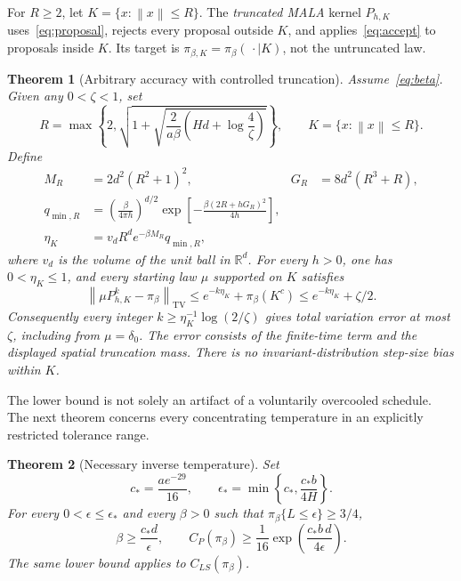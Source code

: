 \documentclass[11pt,letterpaper]{article}
\numberwithin{equation}{section}
\newtheorem{theorem}{Theorem}[section]
\theoremstyle{remark}
\newcommand{\R}{\mathbb R}
\newcommand{\TV}{\mathrm{TV}}
\newcommand{\1}{\mathbf 1}
\newcommand{\norm}[1]{\left\lVert#1\right\rVert}
\begin{document}
For $R\ge2$, let $K=\{x:\norm x\le R\}$. The \emph{truncated MALA} kernel $P_{h,K}$ uses~\eqref{eq:proposal}, rejects every proposal outside $K$, and applies~\eqref{eq:accept} to proposals inside $K$. Its target is $\pi_{\beta,K}=\pi_\beta(\,\cdot\mid K)$, not the untruncated law.

\begin{theorem}[Arbitrary accuracy with controlled truncation]\label{thm:upper}
Assume~\eqref{eq:beta}. Given any $0<\zeta<1$, set
\begin{equation}\label{eq:R}
 R=\max\left\{2,\sqrt{1+\sqrt{\frac2{a\beta}
                   \left(Hd+\log\frac4\zeta\right)}}\right\},
 \qquad K=\{x:\norm x\le R\}.
\end{equation}
Define
\begin{align}
 M_R&=2d^2(R^2+1)^2,& G_R&=8d^2(R^3+R),\label{eq:MG}\\
 q_{\min,R}&=\left(\frac\beta{4\pi h}\right)^{d/2}
 \exp\!\left[-\frac{\beta(2R+hG_R)^2}{4h}\right],\label{eq:qmin}\\
 \eta_K&=v_dR^d e^{-\beta M_R}q_{\min,R},\label{eq:eta}
\end{align}
where $v_d$ is the volume of the unit ball in $\R^d$. For every $h>0$, one has $0<\eta_K\le1$, and every starting law $\mu$ supported on $K$ satisfies
\begin{equation}\label{eq:upper-all}
 \norm{\mu P_{h,K}^k-\pi_\beta}_{\TV}
 \le e^{-k\eta_K}+\pi_\beta(K^c)
 \le e^{-k\eta_K}+\zeta/2.
\end{equation}
Consequently every integer $k\ge\eta_K^{-1}\log(2/\zeta)$ gives total variation error at most $\zeta$, including from $\mu=\delta_0$. The error consists of the finite-time term and the displayed spatial truncation mass. There is no invariant-distribution step-size bias within $K$.
\end{theorem}

The lower bound is not solely an artifact of a voluntarily overcooled schedule. The next theorem concerns every concentrating temperature in an explicitly restricted tolerance range.

\begin{theorem}[Necessary inverse temperature]\label{thm:necessary}
Set
\begin{equation}\label{eq:cstar}
 c_*=\frac{ae^{-29}}{16},\qquad
 \epsilon_*=\min\left\{c_*,\frac{c_*b}{4H}\right\}.
\end{equation}
For every $0<\epsilon\le\epsilon_*$ and every $\beta>0$ such that $\pi_\beta\{L\le\epsilon\}\ge3/4$,
\begin{equation}\label{eq:necessary}
 \beta\ge\frac{c_*d}{\epsilon},\qquad
 C_P(\pi_\beta)\ge\frac1{16}
 \exp\!\left(\frac{c_*b\,d}{4\epsilon}\right).
\end{equation}
The same lower bound applies to $C_{LS}(\pi_\beta)$.
\end{theorem}
\end{document}
